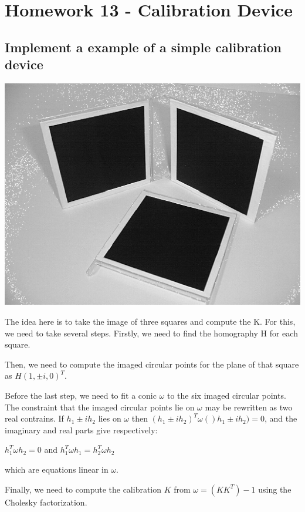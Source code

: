 \documentclass[]{article}
\begin{document}
\section{Homework 13 - Calibration Device }
\subsection{Implement a example of a simple calibration device}



\centerline {
	\includegraphics[scale=0.5]{squares}
}

The idea here is to take the image of three squares and compute the K. For this, we need to take several steps. Firstly, we need to find the homography H for each square. 

Then, we need to compute the imaged circular points for the plane of that square as $H(1, \pm i, 0)^T$. 


Before the last step, we need to fit a conic $\omega$ to the six imaged circular points. The constraint that the imaged circular points lie on $\omega$ may be rewritten as two real contrains. If $h_1 \pm ih_2$ lies on $\omega$ then $(h_1 \pm ih_2)^T \omega ()h_1 \pm ih_2) = 0$, and the imaginary and real parts give respectively: 

\centerline {
	$h_1^T \omega h_2 = 0$ and $h_1^T \omega h_1 = h_2^T \omega h_2$
}


which are equations linear in $\omega$. 

Finally, we need to compute the calibration $K$ from $\omega = (KK^T)-1$ using the Cholesky factorization. 
\end{document}

